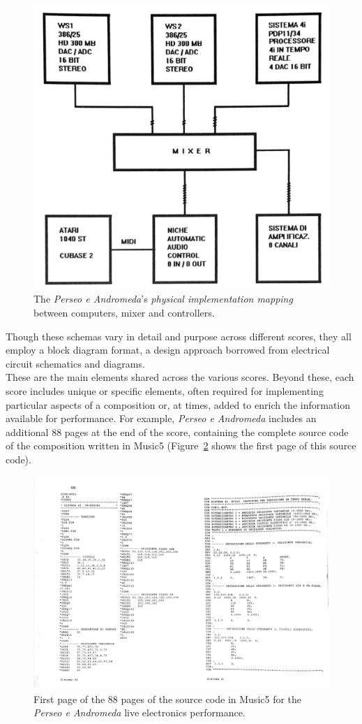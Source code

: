 \begin{figure}[!h]
    \centering
    \includegraphics[width=0.8\linewidth]{chapters/appendix/c/image/figc-perseo-schema03.png}
    \caption{The \textit{Perseo e Andromeda}’s \textit{physical implementation mapping} between computers, mixer and controllers.}
    \label{fig:ac-perseo-schema03}
\end{figure}

Though these schemas vary in detail and purpose across different scores, they all employ a block diagram format, a design approach borrowed from electrical circuit schematics and diagrams.\\
These are the main elements shared across the various scores. Beyond these, each score includes unique or specific elements, often required for implementing particular aspects of a composition or, at times, added to enrich the information available for performance. For example, \textit{Perseo e Andromeda} includes an additional 88 pages at the end of the score, containing the complete source code of the composition written in Music5 (Figure~\ref{fig:ac-perseo-code} shows the first page of this source code).

\begin{figure}[!h]
    \centering
    \includegraphics[width=0.8\linewidth]{chapters/appendix/c/image/figc-perseo-code.png}
    \caption{First page of the 88 pages of the source code in Music5 for the \textit{Perseo e Andromeda} live electronics performance.}
    \label{fig:ac-perseo-code}
\end{figure}


